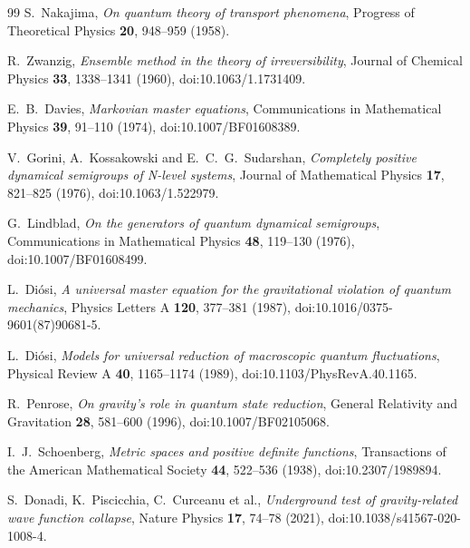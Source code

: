 \documentclass[11pt]{article}
\begin{document}
\begin{thebibliography}{99}
S.~Nakajima, \emph{On quantum theory of transport phenomena}, Progress of
Theoretical Physics \textbf{20}, 948--959 (1958).

R.~Zwanzig, \emph{Ensemble method in the theory of irreversibility}, Journal of
Chemical Physics \textbf{33}, 1338--1341 (1960),
doi:10.1063/1.1731409.

E.~B.~Davies, \emph{Markovian master equations}, Communications in Mathematical
Physics \textbf{39}, 91--110 (1974), doi:10.1007/BF01608389.

V.~Gorini, A.~Kossakowski and E.~C.~G.~Sudarshan,
\emph{Completely positive dynamical semigroups of N-level systems},
Journal of Mathematical Physics \textbf{17}, 821--825 (1976),
doi:10.1063/1.522979.

G.~Lindblad, \emph{On the generators of quantum dynamical semigroups},
Communications in Mathematical Physics \textbf{48}, 119--130 (1976),
doi:10.1007/BF01608499.

L.~Di\'osi, \emph{A universal master equation for the gravitational violation of
quantum mechanics}, Physics Letters A \textbf{120}, 377--381 (1987),
doi:10.1016/0375-9601(87)90681-5.

L.~Di\'osi, \emph{Models for universal reduction of macroscopic quantum
fluctuations}, Physical Review A \textbf{40}, 1165--1174 (1989),
doi:10.1103/PhysRevA.40.1165.

R.~Penrose, \emph{On gravity's role in quantum state reduction},
General Relativity and Gravitation \textbf{28}, 581--600 (1996),
doi:10.1007/BF02105068.

I.~J.~Schoenberg, \emph{Metric spaces and positive definite functions},
Transactions of the American Mathematical Society \textbf{44}, 522--536 (1938),
doi:10.2307/1989894.

S.~Donadi, K.~Piscicchia, C.~Curceanu et al.,
\emph{Underground test of gravity-related wave function collapse},
Nature Physics \textbf{17}, 74--78 (2021),
doi:10.1038/s41567-020-1008-4.
\end{thebibliography}
\end{document}
